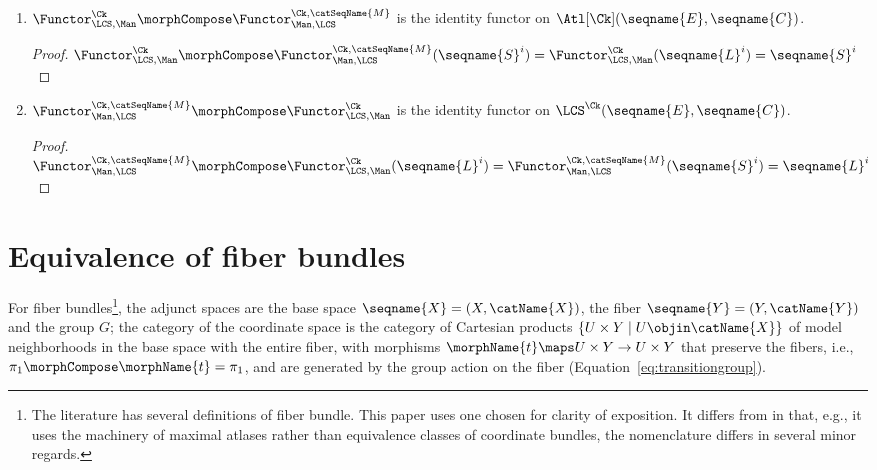 \documentclass{article}
\begin{document}
\begin{theorem}
\begin{enumerate}
\begin{proof}
\begin{description}
\item[Identity:]
$
\Functor^\Ck_{\LCS,\Man} (\morphId[L^i])
=
\Functor^\Ck_{\LCS,\Man}
  \bigl
    (\morphId[E^i], \morphId[\seqname{C}^i]), \seqname{L}^i, \seqname{L}^i
  \bigr )
= \\
  \bigl
    (\morphId[E^i], \morphId[{\seqname{C}^i}]), \seqname{S}^i, \seqname{S}^i
  \bigr )
=
\morphId[{\Functor^\Ck_{\LCS,\Man}}] (L^i)
$
\end{description}
\end{proof}
\item
$
  \Functor^\Ck_{\LCS,\Man}
  \morphCompose
  \Functor^{\Ck,\catSeqName{M}}_{\Man,\LCS}
$
is the identity functor on $\Atl[\Ck](\seqname{E}, \seqname{C})$.
\begin{proof}
$
\Functor^\Ck_{\LCS,\Man} \morphCompose \Functor^{\Ck,\catSeqName{M}}_{\Man,\LCS}
  (\seqname{S}^i) =
\Functor^\Ck_{\LCS,\Man} (\seqname{L}^i) =
\seqname{S}^i
$
\end{proof}
\item
$\Functor^{\Ck,\catSeqName{M}}_{\Man,\LCS} \morphCompose \Functor^\Ck_{\LCS,\Man}$
is the identity functor on $\LCS^\Ck(\seqname{E}, \seqname{C})$.
\begin{proof}
$
\Functor^{\Ck,\catSeqName{M}}_{\Man,\LCS} \morphCompose \Functor^\Ck_{\LCS,\Man}
  (\seqname{L}^i) =
\Functor^{\Ck,\catSeqName{M}}_{\Man,\LCS} (\seqname{S}^i) =
\seqname{L}^i
$
\end{proof}
\end{enumerate}
\end{theorem}

\part{Equivalence of fiber bundles}
\label{part:bun}
For fiber bundles\footnote{
  The literature has several definitions of fiber bundle. This paper
  uses one chosen for clarity of exposition. It differs from
  \cite[p.~8]{TopFib} in that, e.g., it uses the machinery of maximal
  atlases rather than equivalence classes of coordinate bundles, the
  nomenclature differs in several minor regards.
},
the adjunct spaces are the base space $\seqname{X} = (X,\catName{X})$,
the fiber $\seqname{Y} = (Y, \catName{Y})$
and the group $G$;
the category of the coordinate space is the category of Cartesian
products $\{U \times Y \mid U \objin \catName{X}\}$ of model
neighborhoods in the base space with the entire fiber, with morphisms
$\morphName{t} \maps U \times Y \to U \times Y$ that preserve the
fibers, i.e., $\pi_1 \morphCompose \morphName{t} = \pi_1$, and are
generated by the group action on the fiber
(Equation~\eqref{eq:transitiongroup}).
\end{document}
